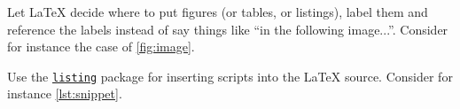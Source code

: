 \documentclass{scrartcl}
\begin{document}
Let \LaTeX{} decide where to put figures (or tables, or listings), label them and reference the labels instead of say things like ``in the following image...''.
%
Consider for instance the case of \cref{fig:image}.

Use the \href{https://en.wikibooks.org/wiki/LaTeX/Source_Code_Listings}{\texttt{listing}} package for inserting scripts into the \LaTeX{} source.
%
Consider for instance \cref{lst:snippet}.


\nocite{*} %


\end{document}
